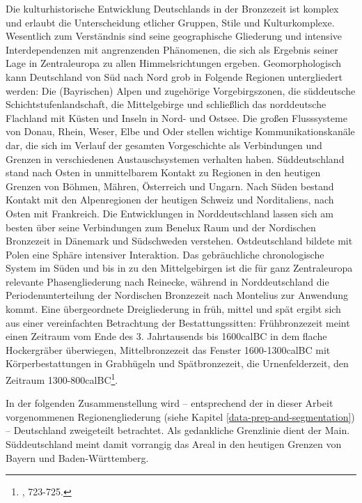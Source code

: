 \documentclass[openany,twoside,twocolumn]{book}
\let\rmarkdownfootnote\footnote%
\def\footnote{\protect\rmarkdownfootnote}
\begin{document}
Die kulturhistorische Entwicklung Deutschlands in der Bronzezeit ist
komplex und erlaubt die Unterscheidung etlicher Gruppen, Stile und
Kulturkomplexe. Wesentlich zum Verständnis sind seine geographische
Gliederung und intensive Interdependenzen mit angrenzenden Phänomenen,
die sich als Ergebnis seiner Lage in Zentraleuropa zu allen
Himmelsrichtungen ergeben. Geomorphologisch kann Deutschland von Süd
nach Nord grob in Folgende Regionen untergliedert werden: Die
(Bayrischen) Alpen und zugehörige Vorgebirgszonen, die süddeutsche
Schichtstufenlandschaft, die Mittelgebirge und schließlich das
norddeutsche Flachland mit Küsten und Inseln in Nord- und Ostsee. Die
großen Flusssysteme von Donau, Rhein, Weser, Elbe und Oder stellen
wichtige Kommunikationskanäle dar, die sich im Verlauf der gesamten
Vorgeschichte als Verbindungen und Grenzen in verschiedenen
Austauschsystemen verhalten haben. Süddeutschland stand nach Osten in
unmittelbarem Kontakt zu Regionen in den heutigen Grenzen von Böhmen,
Mähren, Österreich und Ungarn. Nach Süden bestand Kontakt mit den
Alpenregionen der heutigen Schweiz und Norditaliens, nach Osten mit
Frankreich. Die Entwicklungen in Norddeutschland lassen sich am besten
über seine Verbindungen zum Benelux Raum und der Nordischen Bronzezeit
in Dänemark und Südschweden verstehen. Ostdeutschland bildete mit Polen
eine Sphäre intensiver Interaktion. Das gebräuchliche chronologische
System im Süden und bis in zu den Mittelgebirgen ist die für ganz
Zentraleuropa relevante Phasengliederung nach Reinecke, während in
Norddeutschland die Periodenunterteilung der Nordischen Bronzezeit nach
Montelius zur Anwendung kommt. Eine übergeordnete Dreigliederung in
früh, mittel und spät ergibt sich aus einer vereinfachten Betrachtung
der Bestattungssitten: Frühbronzezeit meint einen Zeitraum vom Ende des
3. Jahrtausends bis 1600calBC in dem flache Hockergräber überwiegen,
Mittelbronzezeit das Fenster 1600-1300calBC mit Körperbestattungen in
Grabhügeln und Spätbronzezeit, die Urnenfelderzeit, den Zeitraum
1300-800calBC\footnote{\textcite{jockenhovel_germany_2013}, 723-725.}.

In der folgenden Zusammenstellung wird -- entsprechend der in dieser
Arbeit vorgenommenen Regionengliederung (siehe Kapitel
\ref{data-prep-and-segmentation}) -- Deutschland zweigeteilt betrachtet.
Als gedankliche Grenzlinie dient der Main. Süddeutschland meint damit
vorrangig das Areal in den heutigen Grenzen von Bayern und
Baden-Württemberg.
\end{document}
